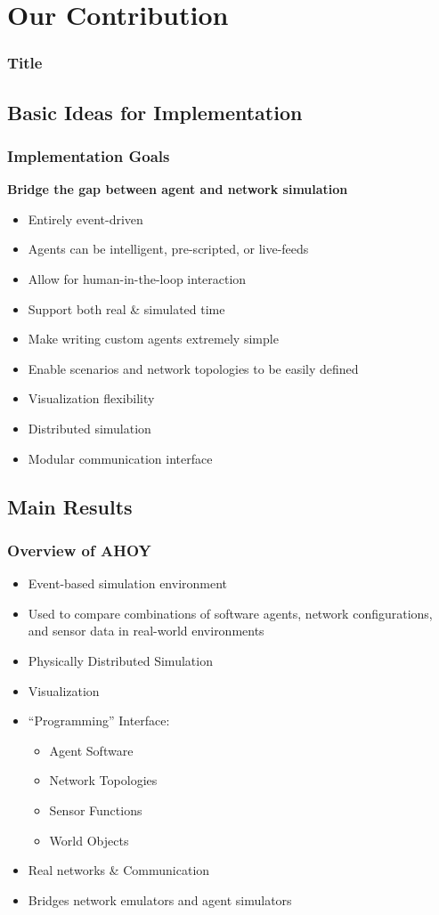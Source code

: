 \documentclass[mathserif]{beamer}
\begin{document}
\section{Our Contribution}

\frame
{
    \frametitle{Title}
}

\subsection{Basic Ideas for Implementation}

\frame
{
    \frametitle{Implementation Goals}
    \textbf{Bridge the gap between agent and network simulation}
    \begin{itemize}
        \item Entirely event-driven
        \item Agents can be intelligent, pre-scripted, or live-feeds
        \item Allow for human-in-the-loop interaction
	\item Support both real \& simulated time
        \item Make writing custom agents extremely simple
        \item Enable scenarios and network topologies to be easily defined
        \item Visualization flexibility
        \item Distributed simulation
        \item Modular communication interface
    \end{itemize}
}


\subsection{Main Results}

\frame
{
    \frametitle{Overview of AHOY}
    \begin{itemize}
	\item Event-based simulation environment
	\item Used to compare combinations of software agents, network configurations, and sensor data in real-world environments
	\item Physically Distributed Simulation
	\item Visualization
	\item ``Programming'' Interface:
	\begin{itemize}
	    \item Agent Software
	    \item Network Topologies
	    \item Sensor Functions
	    \item World Objects
	\end{itemize}
	\item Real networks \& Communication
	\item Bridges network emulators and agent simulators
    \end{itemize}
}
\end{document}
